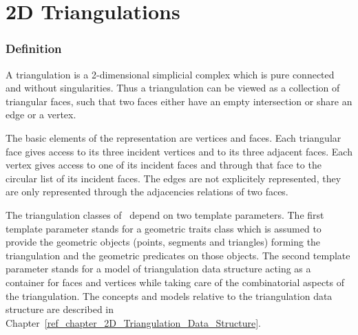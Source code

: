 
\chapter{2D Triangulations}
\label{ref_chapter_2D_Triangulations}

\subsection*{Definition}
A triangulation is a 2-dimensional simplicial complex which is pure
connected and without singularities. Thus a triangulation
can be viewed as a collection of triangular faces,
such that two faces either have an empty intersection or share an edge or a vertex.

The basic elements of the representation are vertices and faces.
Each triangular face gives access to its three incident vertices 
and to its three adjacent faces. 
Each vertex gives access to one of its incident faces
and through that face to the circular list of its incident faces.
The edges are not explicitely represented, they are only represented 
through the adjacencies relations of two faces.

The triangulation classes of \cgal\ depend on two template parameters.
The first template parameter stands for
 a geometric traits class which is assumed to provide
the geometric objects (points, segments and triangles) 
forming  the triangulation and the geometric predicates on those objects.
The second template parameter stands for a model
of  triangulation data
structure acting as a container for faces and vertices
while  taking care of the combinatorial aspects of the triangulation. 
The concepts and models relative to the triangulation data structure
are described in
Chapter~\ref{ref_chapter_2D_Triangulation_Data_Structure}.



